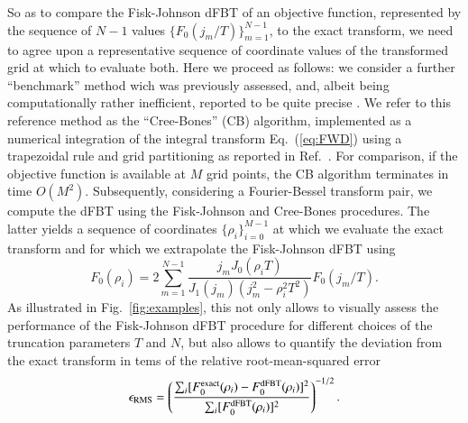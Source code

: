 \documentclass[review]{elsarticle}
\begin{document}
So as to compare the Fisk-Johnson dFBT of an objective function, represented by
the sequence of $N-1$ values $\{F_0(j_m/T)\}_{m=1}^{N-1}$, to the exact
transform, we need to agree upon a representative sequence of coordinate values
of the transformed grid at which to evaluate both. Here we proceed as follows:
we consider a further ``benchmark'' method wich was previously assessed, and,
albeit being computationally rather inefficient, reported to be quite precise
\cite{Cree:1993}. We refer to this reference method as the ``Cree-Bones''
(CB) algorithm, implemented as a numerical integration of the integral transform
Eq.~(\ref{eq:FWD}) using a trapezoidal rule and grid partitioning as reported
in Ref.~\cite{Cree:1993}. For comparison, if the objective function is
available at $M$ grid points, the CB algorithm terminates in time $O(M^2)$.
Subsequently, considering a Fourier-Bessel transform pair, we
compute the dFBT using the Fisk-Johnson and Cree-Bones procedures. The latter
yields a sequence of coordinates $\{\rho_i\}_{i=0}^{M-1}$ at which we 
evaluate the exact transform and for which we extrapolate the Fisk-Johnson 
dFBT using \cite{FiskJohnson:1987}
\begin{equation}
F_0(\rho_i) = 2 \sum_{m=1}^{N-1} \frac{j_m J_0(\rho_i T)}{J_1(j_m)(j_m^2-\rho_i^2 T^2)} F_0(j_m/T). \label{eq:extrapolation}
\end{equation}
As illustrated in Fig.~\ref{fig:examples}, this not only allows to visually
assess the performance of the Fisk-Johnson dFBT procedure for different choices
of the truncation parameters $T$ and $N$, but also allows to quantify the 
deviation from the exact transform in tems of the relative root-mean-squared 
error
\begin{equation}
\epsilon_{\rm RMS} = \left( \frac{\sum_i [F_0^{\rm{exact}}(\rho_i) - F_0^{\rm dFBT}(\rho_i)]^2}{\sum_i [F_0^{\rm dFBT}(\rho_i)]^2} \right)^{-1/2}. \label{eq:rms}
\end{equation}
\end{document}
